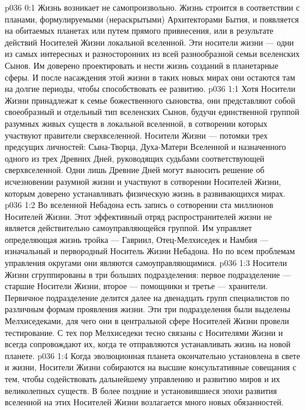 \author{Сын-Ворондадек}
\vs p036 0:1 Жизнь возникает не самопроизвольно. Жизнь строится в соответствии с планами, формулируемыми (нераскрытыми) Архитекторами Бытия, и появляется на обитаемых планетах или путем прямого привнесения, или в результате действий Носителей Жизни локальной вселенной. Эти носители жизни --- одни из самых интересных и разносторонних из всей разнообразной семьи вселенских Сынов. Им доверено проектировать и нести жизнь созданий в планетарные сферы. И после насаждения этой жизни в таких новых мирах они остаются там на долгие периоды, чтобы способствовать ее развитию.
\vs p036 1:1 Хотя Носители Жизни принадлежат к семье божественного сыновства, они представляют собой своеобразный и отдельный тип вселенских Сынов, будучи единственной группой разумных живых существ в локальной вселенной, в сотворении которых участвуют правители сверхвселенной. Носители Жизни --- потомки трех предсущих личностей: Сына\hyp{}Творца, Духа\hyp{}Матери Вселенной и назначенного одного из трех Древних Дней, руководящих судьбами соответствующей сверхвселенной. Одни лишь Древние Дней могут выносить решение об исчезновении разумной жизни и участвуют в сотворении Носителей Жизни, которым доверено устанавливать физическую жизнь в развивающихся мирах.
\vs p036 1:2 Во вселенной Небадона есть запись о сотворении ста миллионов Носителей Жизни. Этот эффективный отряд распространителей жизни не является действительно самоуправляющейся группой. Им управляет определяющая жизнь тройка --- Гавриил, Отец\hyp{}Мелхиседек и Намбия --- изначальный и первородный Носитель Жизни Небадона. Но по всем проблемам управления округами они являются самоуправляющимися.
\vs p036 1:3 Носители Жизни сгруппированы в три больших подразделения: первое подразделение --- старшие Носители Жизни, второе --- помощники и третье --- хранители. Первичное подразделение делится далее на двенадцать групп специалистов по различным формам проявления жизни. Эти три подразделения были выделены Мелхиседеками, для чего они в центральной сфере Носителей Жизни провели тестирование. С тех пор Мелхиседеки тесно связаны с Носителями Жизни и всегда сопровождают их, когда те отправляются устанавливать жизнь на новой планете.
\vs p036 1:4 Когда эволюционная планета окончательно установлена в свете и жизни, Носители Жизни собираются на высшие консультативные совещания с тем, чтобы содействовать дальнейшему управлению и развитию миров и их великолепных существ. В более поздние и установившиеся эпохи развития вселенной на этих Носителей Жизни возлагается много новых обязанностей.
